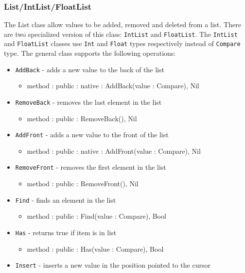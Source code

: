 \documentclass[12pt]{article}
\begin{document}
\subsubsection{List/IntList/FloatList}
The List class allow values to be added, removed and deleted from a list.  There are two specialized version of this class: \texttt{IntList} and \texttt{FloatList}.  The \texttt{IntList} and \texttt{FloatList} classes use \texttt{Int} and \texttt{Float} types respectively instead of \texttt{Compare} type.  The general class supports the following operations:
\begin{itemize}
\item \texttt{AddBack} - adds a new value to the back of the list
  \begin{itemize}
  \item method : public : native : AddBack(value : Compare), Nil
  \end{itemize}
\item \texttt{RemoveBack} - removes the last element in the list
  \begin{itemize}
  \item method : public : RemoveBack(), Nil
  \end{itemize}
\item \texttt{AddFront} - adds a new value to the front of the list
  \begin{itemize}
  \item method : public : native : AddFront(value : Compare), Nil
  \end{itemize}
\item \texttt{RemoveFront} - removes the first element in the list
  \begin{itemize}
  \item method : public : RemoveFront(), Nil
  \end{itemize}
\item \texttt{Find} - finds an element in the list
  \begin{itemize}
  \item method : public : Find(value : Compare), Bool
  \end{itemize}
\item \texttt{Has} - returns true if item is in list
  \begin{itemize}
  \item method : public : Has(value : Compare), Bool
  \end{itemize}
\item \texttt{Insert} - inserts a new value in the position pointed to the cursor
  \begin{itemize}

\end{itemize}
\end{itemize}
\end{document}
